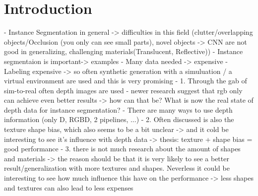
\chapter{Introduction}
\label{chap:kapitel1}

- Instance Segmentation in general -> difficulties in this field (clutter/overlapping objects/Occlusion (you only can see small parts), novel objects -> CNN are not good in generalizing, challenging materials(Translucent, Reflective))
- Instance segmentaion is important-> examples
- Many data needed -> expensive
- Labeling expensive -> so often synthetic generation with a simuluation / a virtual environment are used and this is very promising
- 1. Through the gab of sim-to-real often depth images are used
- newer research suggest that rgb only can achieve even better results -> how can that be? What is now the real state of depth data for instance segmentation?
- There are many ways to use depth information (only D, RGBD, 2 pipelines, ...)
- 2. Often discussed is also the texture shape bias, which also seems to be a bit unclear -> and it cold be interesting to see it's influence with depth data -> thesis: texture + shape bias = good performance
- 3. there is not much research about the amount of shapes and materials -> the reason should be that it is very likely to see a better result/generalization with more textures and shapes. Neverless it could be interesting to see how much influence this have on the performance -> less shapes and textures can also lead to less expenses 



